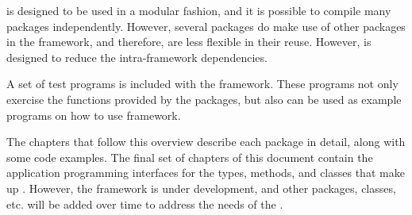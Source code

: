 \sname is designed to be used in a modular fashion, and it is possible to
compile many packages independently. However, several packages do make use
of other packages in the framework, and therefore, are less flexible in their
reuse. However, \sname is designed to reduce the intra-framework
dependencies.

A set of test programs is included with the framework. These programs not only
exercise the functions provided by the packages, but also can be used as
example programs on how to use framework.

The chapters that follow this overview describe each package in detail,
along with some code examples.
The final set of chapters of this document contain the application programming
interfaces for the types, methods, and classes that make up \sname. However,
the framework is under development, and other packages, classes, etc. will be
added over time to address the needs of the \nistig.
